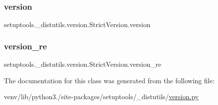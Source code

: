 \subsubsection{\texorpdfstring{version}{version}}
{\footnotesize\ttfamily setuptools.\+\_\+distutils.\+version.\+Strict\+Version.\+version}

\mbox{\label{classsetuptools_1_1__distutils_1_1version_1_1StrictVersion_a94d0d0d109081b71e41ad7d513e5419f}} 
\subsubsection{\texorpdfstring{version\+\_\+re}{version\_re}}
{\footnotesize\ttfamily setuptools.\+\_\+distutils.\+version.\+Strict\+Version.\+version\+\_\+re\hspace{0.3cm}{\ttfamily [static]}}



The documentation for this class was generated from the following file\+:\begin{DoxyCompactItemize}
\item 
venv/lib/python3./site-\/packages/setuptools/\+\_\+distutils/\hyperlink{setuptools_2__distutils_2version_8py}{version.\+py}\end{DoxyCompactItemize}
